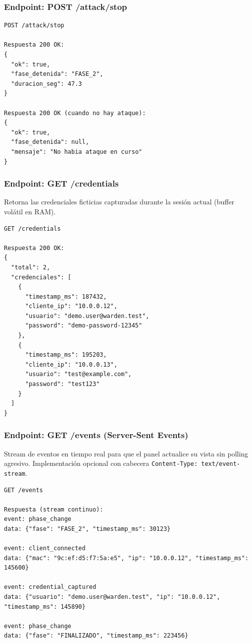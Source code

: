 \documentclass[11pt,a4paper]{article}
\begin{document}
\subsubsection{Endpoint: POST /attack/stop}

\begin{lstlisting}
POST /attack/stop

Respuesta 200 OK:
{
  "ok": true,
  "fase_detenida": "FASE_2",
  "duracion_seg": 47.3
}

Respuesta 200 OK (cuando no hay ataque):
{
  "ok": true,
  "fase_detenida": null,
  "mensaje": "No habia ataque en curso"
}
\end{lstlisting}

\subsubsection{Endpoint: GET /credentials}

Retorna las credenciales ficticias capturadas durante la sesión actual
(buffer volátil en RAM).

\begin{lstlisting}
GET /credentials

Respuesta 200 OK:
{
  "total": 2,
  "credenciales": [
    {
      "timestamp_ms": 187432,
      "cliente_ip": "10.0.0.12",
      "usuario": "demo.user@warden.test",
      "password": "demo-password-12345"
    },
    {
      "timestamp_ms": 195203,
      "cliente_ip": "10.0.0.13",
      "usuario": "test@example.com",
      "password": "test123"
    }
  ]
}
\end{lstlisting}

\subsubsection{Endpoint: GET /events (Server-Sent Events)}

Stream de eventos en tiempo real para que el panel actualice su vista
sin polling agresivo. Implementación opcional con cabecera
\texttt{Content-Type: text/event-stream}.

\begin{lstlisting}
GET /events

Respuesta (stream continuo):
event: phase_change
data: {"fase": "FASE_2", "timestamp_ms": 30123}

event: client_connected
data: {"mac": "9c:ef:d5:f7:5a:e5", "ip": "10.0.0.12", "timestamp_ms": 145600}

event: credential_captured
data: {"usuario": "demo.user@warden.test", "ip": "10.0.0.12", "timestamp_ms": 145890}

event: phase_change
data: {"fase": "FINALIZADO", "timestamp_ms": 223456}
\end{lstlisting}
\end{document}
